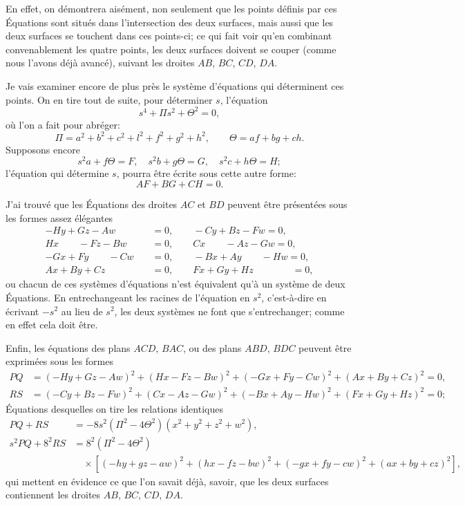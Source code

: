 \documentclass[11pt,a4paper]{book}
\begin{document}
\newpage

\setcounter{page}{419}

En effet, on d\'{e}montrera ais\'{e}ment, non seulement que les points d\'{e}finis par ces \'{E}quations sont situ\'{e}s dans l'intersection des deux surfaces, mais aussi que les deux surfaces se touchent dans ces points-ci; ce qui fait voir qu'en combinant convenablement les quatre points, les deux surfaces doivent se couper (comme nous l'avons d\'{e}j\`{a} avanc\'{e}), suivant les droites $AB$, $BC$, $CD$, $DA$.

Je vais examiner encore de plus pr\`{e}s le syst\`{e}me d'\'{e}quations qui d\'{e}terminent ces points. On en tire tout de suite, pour d\'{e}terminer $s$, l'\'{e}quation
\[
s^{4} + \Pi s^{2} + \Theta^{2} = 0,
\]
o\`{u} l'on a fait pour abr\'{e}ger:
\[
\Pi = a^{2} + b^{2} + c^{2} + l^{2} + f^{2} + g^{2} + h^{2}, \qquad \Theta = af + bg + ch.
\]
Supposons encore
\[
s^{2}a + f\Theta = F, \quad s^{2}b + g\Theta = G, \quad s^{2}c + h\Theta = H;
\]
l'\'{e}quation qui d\'{e}termine $s$, pourra \^{e}tre \'{e}crite sous cette autre forme:
\[
AF + BG + CH = 0.
\]

J'ai trouv\'{e} que les \'{E}quations des droites $AC$ et $BD$ peuvent \^{e}tre pr\'{e}sent\'{e}es sous les formes assez \'{e}l\'{e}gantes
\begin{align*}
-Hy + Gz - Aw &= 0, \qquad -Cy + Bz - Fw = 0, \\
Hx \qquad - Fz - Bw &= 0, \qquad Cx \qquad - Az - Gw = 0, \\
-Gx + Fy \qquad - Cw &= 0, \qquad -Bx + Ay \qquad - Hw = 0, \\
Ax + By + Cz \qquad\qquad &= 0, \qquad Fx + Gy + Hz \qquad\qquad = 0,
\end{align*}
ou chacun de ces syst\`{e}mes d'\'{e}quations n'est \'{e}quivalent qu'\`{a} un syst\`{e}me de deux \'{E}quations. En entrechangeant les racines de l'\'{e}quation en $s^{2}$, c'est-\`{a}-dire en \'{e}crivant $-s^{2}$ au lieu de $s^{2}$, les deux syst\`{e}mes ne font que s'entrechanger; comme en effet cela doit \^{e}tre.

Enfin, les \'{e}quations des plans $ACD$, $BAC$, ou des plans $ABD$, $BDC$ peuvent \^{e}tre exprim\'{e}es sous les formes
\begin{align*}
PQ &= (-Hy + Gz - Aw)^{2} + (Hx - Fz - Bw)^{2} + (-Gx + Fy - Cw)^{2} + (Ax + By + Cz)^{2} = 0, \\
RS &= (-Cy + Bz - Fw)^{2} + (Cx - Az - Gw)^{2} + (-Bx + Ay - Hw)^{2} + (Fx + Gy + Hz)^{2} = 0;
\end{align*}
\'{E}quations desquelles on tire les relations identiques
\begin{align*}
PQ + RS &= -8s^{2}(\Pi^{2} - 4\Theta^{2})(x^{2} + y^{2} + z^{2} + w^{2}), \\
s^{2}PQ + 8^{2}RS &= 8^{2}(\Pi^{2} - 4\Theta^{2}) \\
&\quad \times [(-hy + gz - aw)^{2} + (hx - fz - bw)^{2} + (-gx + fy - cw)^{2} + (ax + by + cz)^{2}],
\end{align*}
qui mettent en \'{e}vidence ce que l'on savait d\'{e}j\`{a}, savoir, que les deux surfaces contiennent les droites $AB$, $BC$, $CD$, $DA$.
\end{document}
